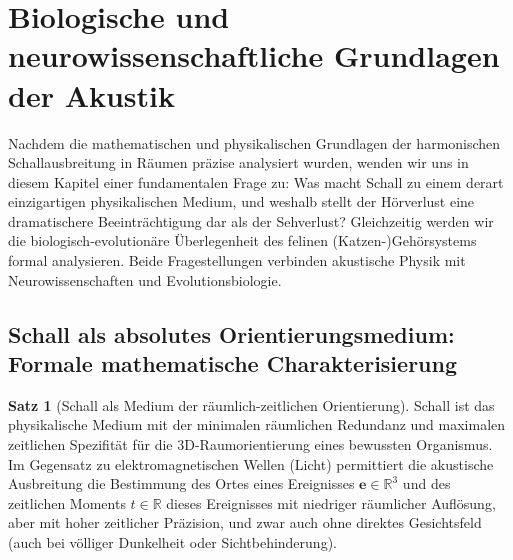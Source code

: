 ﻿\documentclass[12pt, a4paper]{article}
\theoremstyle{definition}
\newtheorem{satz}{Satz}[section]
\theoremstyle{remark}
\begin{document}
\section{Biologische und neurowissenschaftliche Grundlagen der Akustik}
\label{sec:biologie}

Nachdem die mathematischen und physikalischen Grundlagen der harmonischen Schallausbreitung in Räumen präzise analysiert wurden, wenden wir uns in diesem Kapitel einer fundamentalen Frage zu: Was macht Schall zu einem derart einzigartigen physikalischen Medium, und weshalb stellt der Hörverlust eine dramatischere Beeinträchtigung dar als der Sehverlust? Gleichzeitig werden wir die biologisch-evolutionäre Überlegenheit des felinen (Katzen-)Gehörsystems formal analysieren. Beide Fragestellungen verbinden akustische Physik mit Neurowissenschaften und Evolutionsbiologie.

\subsection{Schall als absolutes Orientierungsmedium: Formale mathematische Charakterisierung}
\label{subsec:schall_medium}

\begin{satz}[Schall als Medium der räumlich-zeitlichen Orientierung]
\label{satz:schall_medium}
Schall ist das physikalische Medium mit der minimalen räumlichen Redundanz und maximalen zeitlichen Spezifität für die 3D-Raumorientierung eines bewussten Organismus. Im Gegensatz zu elektromagnetischen Wellen (Licht) permittiert die akustische Ausbreitung die Bestimmung des Ortes eines Ereignisses $\mathbf{e} \in \mathbb{R}^3$ und des zeitlichen Moments $t \in \mathbb{R}$ dieses Ereignisses mit niedriger räumlicher Auflösung, aber mit hoher zeitlicher Präzision, und zwar auch ohne direktes Gesichtsfeld (auch bei völliger Dunkelheit oder Sichtbehinderung).
\end{satz}
\end{document}
